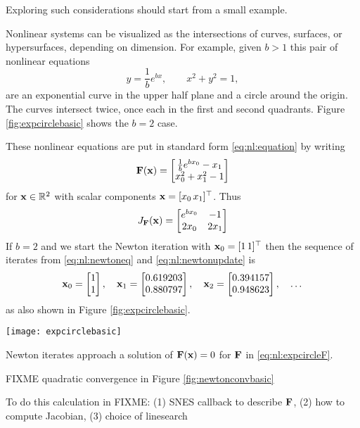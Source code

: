Exploring such considerations should start from a small example.

\medskip\noindent\hrulefill
\begin{example}  Nonlinear systems can be visualized as the intersections of curves, surfaces, or hypersurfaces, depending on dimension.  For example, given $b > 1$ this pair of nonlinear equations
    $$y = \frac{1}{b} e^{bx}, \qquad x^2+y^2 = 1,$$
are an exponential curve in the upper half plane and a circle around the origin.  The curves intersect twice, once each in the first and second quadrants.  Figure \ref{fig:expcirclebasic} shows the $b=2$ case. 

These nonlinear equations are put in standard form \eqref{eq:nl:equation} by writing
\begin{equation}
\label{eq:nl:expcircleF}
\mathbf{F}(\mathbf{x}) = \begin{bmatrix}
           \frac{1}{b} e^{b x_0} - x_1 \\
           x_0^2 + x_1^2 - 1
           \end{bmatrix}
\end{equation}
for $\mathbf{x}\in \mathbb{R}^2$ with scalar components $\mathbf{x} = [x_0 \, x_1]^\top$.  Thus
\begin{equation}
J_{\mathbf{F}}(\mathbf{x}) = \begin{bmatrix}
    e^{b x_0} & -1 \\
    2 x_0   & 2 x_1 \end{bmatrix}
\end{equation}
If $b=2$ and we start the Newton iteration with $\mathbf{x}_0 = [1 \, 1]^\top$ then the sequence of iterates from \eqref{eq:nl:newtoneq} and \eqref{eq:nl:newtonupdate} is
    $${\mathbf{x}}_{0} = \begin{bmatrix} 1 \\ 1 \end{bmatrix}, \quad {\mathbf{x}}_{1} = \begin{bmatrix} 0.619203 \\ 0.880797 \end{bmatrix}, \quad {\mathbf{x}}_{2} = \begin{bmatrix} 0.394157 \\ 0.948623 \end{bmatrix}, \quad \dots$$
as also shown in Figure \ref{fig:expcirclebasic}.

\noindent\hrulefill
\end{example}

\begin{marginfigure}
\texttt{[image: expcirclebasic]}
\caption{Newton iterates approach a solution of $\mathbf{F}(\mathbf{x})=0$ for $\mathbf{F}$ in \eqref{eq:nl:expcircleF}.}
\label{fig:expcirclebasic}
\end{marginfigure}

FIXME quadratic convergence in Figure \ref{fig:newtonconvbasic}

To do this calculation in \PETSc FIXME: (1) SNES callback to describe $\mathbf{F}$, (2) how to compute Jacobian, (3) choice of linesearch

